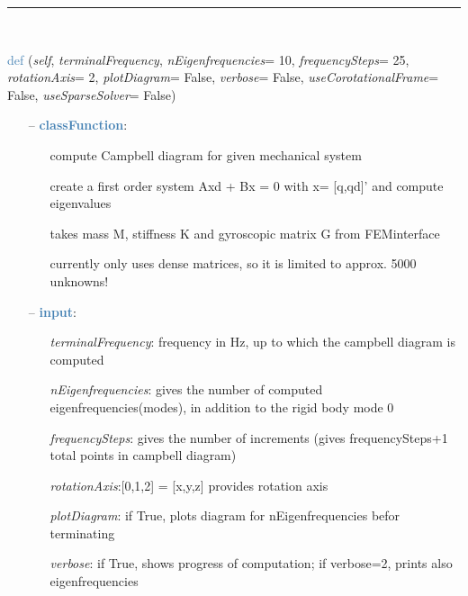 \begin{itemize}[leftmargin=1.4cm]
\begin{itemize}[leftmargin=0.5cm]
\begin{itemize}[leftmargin=1.4cm]
\begin{itemize}[leftmargin=1.4cm]
\begin{itemize}[leftmargin=0.5cm]
%
\noindent\rule{8cm}{0.75pt}\vspace{1pt} \\ 
\begin{flushleft}
\noindent \textcolor{steelblue}{def {\bf {}}}\label{sec:FEM:FEMinterface:ComputeCampbellDiagram}
({\it self}, {\it terminalFrequency}, {\it nEigenfrequencies}= 10, {\it frequencySteps}= 25, {\it rotationAxis}= 2, {\it plotDiagram}= False, {\it verbose}= False, {\it useCorotationalFrame}= False, {\it useSparseSolver}= False)
\end{flushleft}
\setlength{\itemindent}{0.7cm}
\begin{itemize}[leftmargin=0.7cm]
  \item[--]  \textcolor{steelblue}{\bf classFunction}: \vspace{-6pt}
  \begin{itemize}[leftmargin=1.2cm]
\setlength{\itemindent}{-0.7cm}
    \item[] compute Campbell diagram for given mechanical system
    \item[] create a first order system Axd + Bx = 0 with x= [q,qd]' and compute eigenvalues
    \item[] takes mass M, stiffness K and gyroscopic matrix G from FEMinterface
    \item[] currently only uses dense matrices, so it is limited to approx. 5000 unknowns!
  \end{itemize}
  \item[--]  \textcolor{steelblue}{\bf input}: \vspace{-6pt}
  \begin{itemize}[leftmargin=1.2cm]
\setlength{\itemindent}{-0.7cm}
    \item[] {\it terminalFrequency}: frequency in Hz, up to which the campbell diagram is computed
    \item[] {\it   nEigenfrequencies}: gives the number of computed eigenfrequencies(modes), in addition to the rigid body mode 0
    \item[] {\it   frequencySteps}: gives the number of increments (gives frequencySteps+1 total points in campbell diagram)
    \item[] {\it   rotationAxis}:[0,1,2] = [x,y,z] provides rotation axis
    \item[] {\it   plotDiagram}: if True, plots diagram for nEigenfrequencies befor terminating
    \item[] {\it   verbose}: if True, shows progress of computation; if verbose=2, prints also eigenfrequencies

\end{itemize}
\end{itemize}
\end{itemize}
\end{itemize}
\end{itemize}
\end{itemize}
\end{itemize}
